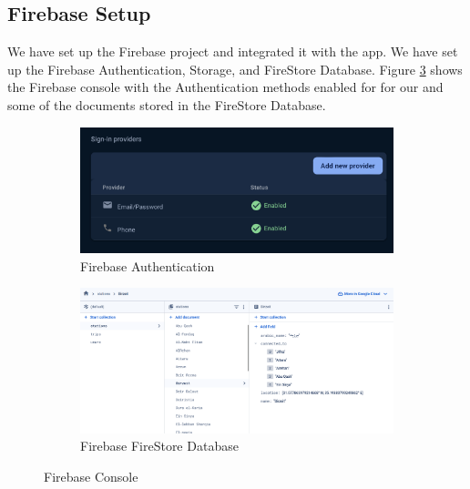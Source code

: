 \documentclass[a4paper, 12pt]{report} %
\begin{document}
        \subsection{Firebase Setup}
            We have set up the Firebase project and integrated it with the app. We have set up the Firebase Authentication, Storage, and FireStore Database. Figure \ref{fig:firebase_setup} shows the Firebase console with the Authentication methods enabled for for our and some of the documents stored in the FireStore Database.
            \begin{figure}[H]
                \centering
                \begin{subfigure}{0.7\textwidth}
                    \includegraphics[width=\linewidth]{Images/firebase_auth.png}
                    \caption{Firebase Authentication}
                    \label{fig:firebase_auth}
                \end{subfigure}
                \begin{subfigure}{0.7\textwidth}
                    \includegraphics[width=\linewidth]{Images/firestore.png}
                    \caption{Firebase FireStore Database}
                    \label{fig:firebase_database}
                \end{subfigure}
                \caption{Firebase Console}
                \label{fig:firebase_setup}
            \end{figure}
        
\end{document}

